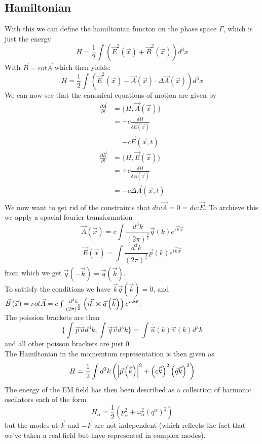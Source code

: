 \documentclass{report}
\begin{document}
\subsection{Hamiltonian}
With this we can define the hamiltonian functon on the phase space $\Gamma$, which is just the energy \[
  H = \frac{1}{2} \int \left( \vec{E}^2\left( \vec{x} \right) + \vec{B}^2\left( \vec{x} \right)  \right) d^{3}x
\] With $\vec{B} = rot \vec{A}$ which then yields: \[
H = \frac{1}{2} \int \left( \vec{E}^2\left( \vec{x} \right) - \vec{A}\left( \vec{x} \right)  \cdot \Delta \vec{A}\left( \vec{x} \right)  \right) d^{3}x
\] 
We can now see that the canonical equations of motion are given by
\begin{align*}
  \frac{\partial \vec{A}}{\partial t} &= \{H, \vec{A}\left( \vec{x} \right) \} \\
                                      &= -c \frac{\delta H}{\delta \vec{E}\left( \vec{x} \right) } \\
                                      &= -c \vec{E}\left( \vec{x}, t \right)  \\
  \frac{\partial \vec{E}}{\partial t} &= \{H, \vec{E}\left( \vec{x} \right) \} \\
                                      &= +c \frac{\delta H}{\delta \vec{A}\left( \vec{x} \right) } \\
                                      &= -c \Delta \vec{A}\left( \vec{x},t \right)  \\
\end{align*}
We now want to get rid of the constraints that $div \vec{A} = 0 = div \vec{E}$. To archieve this we apply a spacial fourier transformation \[
  \vec{A}\left( \vec{x} \right) = c \int \frac{d^{3}k}{\left( 2 \pi \right) ^{\frac{3}{2}}} \vec{q}\left( k \right) e^{i\vec{k}\vec{x}}
\] \[
\vec{E}\left( \vec{x} \right) = \int \frac{d^{3}k}{\left( 2 \pi \right) ^{\frac{3}{2}}} \vec{p}\left( k \right) e^{i\vec{k}\vec{x}}
\] 
from which we get $\vec{q}\left( -\vec{k} \right) = \overline{\vec{q}\left( \vec{k} \right) }$.\\
To sattisfy the conditions we have $\vec{k} \vec{q}\left( \vec{k} \right) = 0$, and $\vec{B}\left( \vec{x} \right) = rot \vec{A} = c \int \frac{d^{3}k}{\left( 2 \pi \right) ^{\frac{3}{2}}} \left( i \vec{k} \cross \vec{q}\left( \vec{k} \right)  \right) e^{u\vec{k}\vec{x}}$.\\
The poission brackets are then \[
  \{\int \vec{p} \overline{\vec{u}} d^{3}k, \int \vec{q} \vec{v} d^{3}k \} = \int \overline{\vec{u}}\left( k \right) \vec{v}\left( k \right) d^{3}k
\] and all other poisson brackets are just $0$. \\
The Hamiltonian in the momemtum representation is then given as \[
  H = \frac{1}{2} \int d^{3}k \left( \abs{\vec{p}\left( \vec{k} \right) }^2 + \left( c\vec{k} \right) ^2\left( \vec{q} \vec{k} \right) ^2 \right) 
\] 
The energy of the EM field has then been described as a collection of harmonic oscilators each of the form \[
  H_\alpha = \frac{1}{2} \left( p_\alpha^2 + \omega_\alpha^2\left( q^\alpha \right) ^2 \right) 
\] 
but the modes at $\vec{k}$ and $-\vec{k}$ are not independent (which reflects the fact that we've taken a real field but have represented in complex modes).
\end{document}
